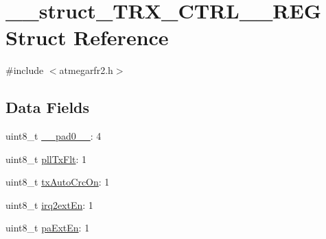 \hypertarget{struct____struct___t_r_x___c_t_r_l__1___r_e_g}{\section{\-\_\-\-\_\-struct\-\_\-\-T\-R\-X\-\_\-\-C\-T\-R\-L\-\_\-\_\-\-R\-E\-G Struct Reference}
\label{struct____struct___t_r_x___c_t_r_l__1___r_e_g}
}


{\ttfamily \#include $<$atmegarfr2.\-h$>$}

\subsection*{Data Fields}
\begin{DoxyCompactItemize}
\item 
uint8\-\_\-t \hyperlink{struct____struct___t_r_x___c_t_r_l__1___r_e_g_a8a33674ecd6443007b49d73b8f2e974c}{\-\_\-\-\_\-pad0\-\_\-\-\_\-}\-: 4
\item 
uint8\-\_\-t \hyperlink{struct____struct___t_r_x___c_t_r_l__1___r_e_g_a2472727d56c78ed2e58d7ee34224d9f9}{pll\-Tx\-Flt}\-: 1
\item 
uint8\-\_\-t \hyperlink{struct____struct___t_r_x___c_t_r_l__1___r_e_g_a1c9bd919f3287cc68ce143c761f93191}{tx\-Auto\-Crc\-On}\-: 1
\item 
uint8\-\_\-t \hyperlink{struct____struct___t_r_x___c_t_r_l__1___r_e_g_a8f4787301f9f20077ccff53ac357eaa8}{irq2ext\-En}\-: 1
\item 
uint8\-\_\-t \hyperlink{struct____struct___t_r_x___c_t_r_l__1___r_e_g_a5d7ec52f8b48172e85fe9931c1546d78}{pa\-Ext\-En}\-: 1
\end{DoxyCompactItemize}


